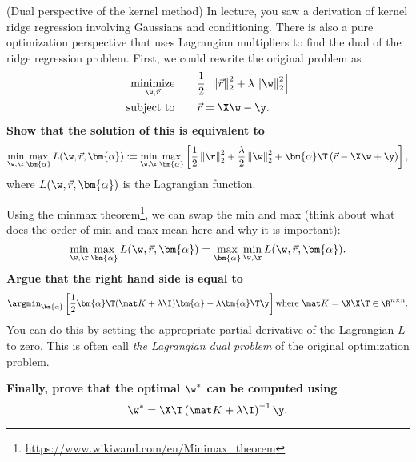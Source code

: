 \documentclass[preview]{standalone}
\begin{document}
\begin{Parts}


\Part (Dual perspective of the kernel method)
In lecture, you saw a derivation of kernel ridge regression involving Gaussians and conditioning.
There is also a pure optimization perspective that uses
Lagrangian multipliers to find the dual of the ridge regression problem.  First, we could rewrite the
original problem as
\begin{align*}
  \operatorname*{minimize}_{\w, \vec r} &  \qquad \frac 1 2 \left[
    \left\lVert \vec r \right\rVert_2^2 +
    \lambda\left\lVert \w \right\rVert_2^2
    \right] \\
  \text{subject to} & \qquad \vec r = \X\w-\y.
\end{align*}
\textbf{Show that the solution of this is equivalent to}
\begin{equation}
  \min_{\w,\r}\max_{\bm{\alpha}} L(\w, \vec r, \bm{\alpha}) :=
  \min_{\w,\r}\max_{\bm{\alpha}} \left[
  \frac 1 2 \left\lVert \r \right\rVert_2^2
  + \frac \lambda 2 \left\lVert \w \right\rVert_2^2
  + \bm{\alpha}\T \left( \vec r - \X\w + \y\right)\right],
\end{equation}
where $L(\w, \vec r, \bm{\alpha})$ is the Lagrangian function.

\Part Using the minmax theorem\footnote{\url{https://www.wikiwand.com/en/Minimax_theorem}}, we can
swap the min and max (think about what does the order of min and max mean here and why it is important):
\begin{equation}
  \min_{\w,\r}\max_{\bm{\alpha}} L(\w, \vec r, \bm{\alpha}) = \max_{\bm{\alpha}} \min_{\w,\r} L(\w, \vec r, \bm{\alpha}).
\end{equation}
\textbf{Argue that the right hand side is equal to}
\begin{equation}
  \argmin_{\bm{\alpha}} \left[ \frac{1}{2} \bm{\alpha}\T (\mat K+\lambda \I) \bm{\alpha} - \lambda \bm{\alpha}\T \y \right]
  \text{where $\mat K = \X\X\T \in \R^{n \times n}$}.
\end{equation}
You can do this by setting the appropriate partial derivative of the Lagrangian $L$ to zero.  This
is often call \emph{the Lagrangian dual problem} of the original optimization problem.

\Part \textbf{Finally, prove
that the optimal $\w^*$ can be computed using}
\begin{equation}
  \w^* = \X\T \left( \mat K + \lambda\I \right)^{-1}\y.
\end{equation}




\end{Parts}
\end{document}
